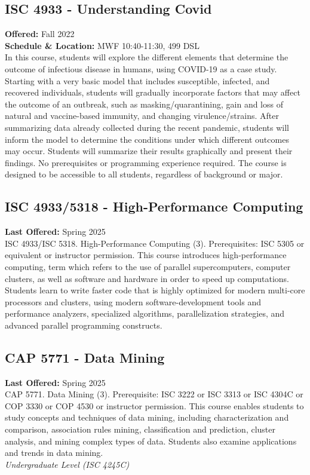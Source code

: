 \documentclass[12pt,a4paper]{article}
\begin{document}
\subsection{ISC 4933 - Understanding Covid}
\textbf{Offered:} Fall 2022 \\
\textbf{Schedule \& Location:} MWF 10:40-11:30, 499 DSL \\
In this course, students will explore the different elements that determine the outcome of infectious disease in humans, using COVID-19 as a case study. Starting with a very basic model that includes susceptible, infected, and recovered individuals, students will gradually incorporate factors that may affect the outcome of an outbreak, such as masking/quarantining, gain and loss of natural and vaccine-based immunity, and changing virulence/strains. After summarizing data already collected during the recent pandemic, students will inform the model to determine the conditions under which different outcomes may occur. Students will summarize their results graphically and present their findings. No prerequisites or programming experience required. The course is designed to be accessible to all students, regardless of background or major.

\subsection{ISC 4933/5318 - High-Performance Computing}
\textbf{Last Offered:} Spring 2025 \\
ISC 4933/ISC 5318. High-Performance Computing (3). Prerequisites: ISC 5305 or equivalent or instructor permission. This course introduces high-performance computing, term which refers to the use of parallel supercomputers, computer clusters, as well as software and hardware in order to speed up computations. Students learn to write faster code that is highly optimized for modern multi-core processors and clusters, using modern software-development tools and performance analyzers, specialized algorithms, parallelization strategies, and advanced parallel programming constructs.

\subsection{CAP 5771 - Data Mining}
\textbf{Last Offered:} Spring 2025 \\
CAP 5771. Data Mining (3). Prerequisite: ISC 3222 or ISC 3313 or ISC 4304C or COP 3330 or COP 4530 or instructor permission. This course enables students to study concepts and techniques of data mining, including characterization and comparison, association rules mining, classification and prediction, cluster analysis, and mining complex types of data. Students also examine applications and trends in data mining. \\
\textit{Undergraduate Level (ISC 4245C)}
\end{document}
